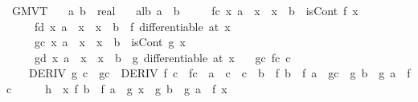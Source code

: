 \begin{isabellebody}
\isamarkupfalse%
\ GMVT{\isacharcolon}{\kern0pt}\isanewline
\ \ \ a\ b\ {\isacharcolon}{\kern0pt}{\isacharcolon}{\kern0pt}\ real\isanewline
\ \ \ alb{\isacharcolon}{\kern0pt}\ {\isachardoublequoteopen}a\ {\isacharless}{\kern0pt}\ b{\isachardoublequoteclose}\isanewline
\ \ \ \ \ fc{\isacharcolon}{\kern0pt}\ {\isachardoublequoteopen}{\isasymforall}x{\isachardot}{\kern0pt}\ a\ {\isasymle}\ x\ {\isasymand}\ x\ {\isasymle}\ b\ {\isasymlongrightarrow}\ isCont\ f\ x{\isachardoublequoteclose}\isanewline
\ \ \ \ \ fd{\isacharcolon}{\kern0pt}\ {\isachardoublequoteopen}{\isasymforall}x{\isachardot}{\kern0pt}\ a\ {\isacharless}{\kern0pt}\ x\ {\isasymand}\ x\ {\isacharless}{\kern0pt}\ b\ {\isasymlongrightarrow}\ f\ differentiable\ {\isacharparenleft}{\kern0pt}at\ x{\isacharparenright}{\kern0pt}{\isachardoublequoteclose}\isanewline
\ \ \ \ \ gc{\isacharcolon}{\kern0pt}\ {\isachardoublequoteopen}{\isasymforall}x{\isachardot}{\kern0pt}\ a\ {\isasymle}\ x\ {\isasymand}\ x\ {\isasymle}\ b\ {\isasymlongrightarrow}\ isCont\ g\ x{\isachardoublequoteclose}\isanewline
\ \ \ \ \ gd{\isacharcolon}{\kern0pt}\ {\isachardoublequoteopen}{\isasymforall}x{\isachardot}{\kern0pt}\ a\ {\isacharless}{\kern0pt}\ x\ {\isasymand}\ x\ {\isacharless}{\kern0pt}\ b\ {\isasymlongrightarrow}\ g\ differentiable\ {\isacharparenleft}{\kern0pt}at\ x{\isacharparenright}{\kern0pt}{\isachardoublequoteclose}\isanewline
\ \ \ {\isachardoublequoteopen}{\isasymexists}g{\isacharprime}{\kern0pt}c\ f{\isacharprime}{\kern0pt}c\ c{\isachardot}{\kern0pt}\isanewline
\ \ \ \ DERIV\ g\ c\ {\isacharcolon}{\kern0pt}{\isachargreater}{\kern0pt}\ g{\isacharprime}{\kern0pt}c\ {\isasymand}\ DERIV\ f\ c\ {\isacharcolon}{\kern0pt}{\isachargreater}{\kern0pt}\ f{\isacharprime}{\kern0pt}c\ {\isasymand}\ a\ {\isacharless}{\kern0pt}\ c\ {\isasymand}\ c\ {\isacharless}{\kern0pt}\ b\ {\isasymand}\ {\isacharparenleft}{\kern0pt}f\ b\ {\isacharminus}{\kern0pt}\ f\ a{\isacharparenright}{\kern0pt}\ {\isacharasterisk}{\kern0pt}\ g{\isacharprime}{\kern0pt}c\ {\isacharequal}{\kern0pt}\ {\isacharparenleft}{\kern0pt}g\ b\ {\isacharminus}{\kern0pt}\ g\ a{\isacharparenright}{\kern0pt}\ {\isacharasterisk}{\kern0pt}\ f{\isacharprime}{\kern0pt}c{\isachardoublequoteclose}\isanewline
%
\isadelimproof
%
\endisadelimproof
%
\isatagproof
{}\isamarkupfalse%
\ {\isacharminus}{\kern0pt}\isanewline
\ \ \isamarkupfalse%
\ {\isacharquery}{\kern0pt}h\ {\isacharequal}{\kern0pt}\ {\isachardoublequoteopen}{\isasymlambda}x{\isachardot}{\kern0pt}\ {\isacharparenleft}{\kern0pt}f\ b\ {\isacharminus}{\kern0pt}\ f\ a{\isacharparenright}{\kern0pt}\ {\isacharasterisk}{\kern0pt}\ g\ x\ {\isacharminus}{\kern0pt}\ {\isacharparenleft}{\kern0pt}g\ b\ {\isacharminus}{\kern0pt}\ g\ a{\isacharparenright}{\kern0pt}\ {\isacharasterisk}{\kern0pt}\ f\ x{\isachardoublequoteclose}\isanewline

\end{isabellebody}

